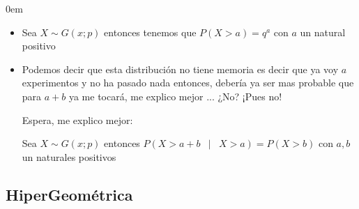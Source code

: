 \documentclass[12pt, fleqn]{report}                             %
\newenvironment{SmallIndentation}[1][0.75em]                    %
        {\begin{adjustwidth}{#1}{}\begin{footnotesize}}             %
        {\end{footnotesize}\end{adjustwidth}}                       %
\DeclareMathOperator \Space     {\quad}                         %
\DeclareMathOperator \MiniSpace {\;}                            %
\newcommand \Such           {\MiniSpace | \MiniSpace}           %
\theoremstyle{break}                                            %
\begin{document}
\begin{multicols}{2}
\begin{SmallIndentation}[0em]
\begin{itemize}
                            \item 
                                Sea $X \sim G(x; p)$ entonces tenemos que $P(X > a) = q^a$ con $a$ un natural positivo

                            \item 
                                Podemos decir que esta distribución no tiene memoria es decir que ya voy $a$ experimentos
                                y no ha pasado nada entonces, debería ya ser mas probable que para $a + b$ ya me tocará,
                                me explico mejor ... ¿No? ¡Pues no!

                                Espera, me explico mejor:

                                Sea $X \sim G(x; p)$ entonces $P(X > a + b \Such X > a) = P(X > b)$ 
                                con $a, b$ un naturales positivos

                        \end{itemize}


                \end{SmallIndentation}
                \end{multicols}


            \clearpage
            \subsection{HiperGeométrica}
\end{document}
